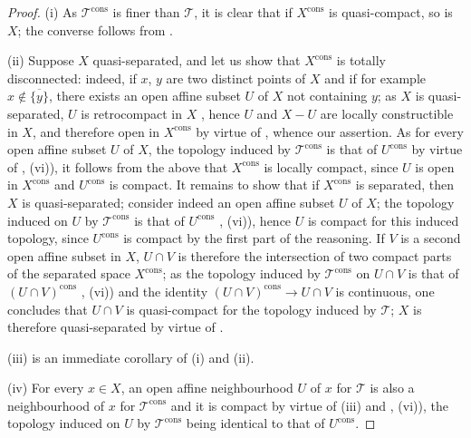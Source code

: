 \begin{proof}
(i) As $\mathscr{T}^{\mathrm{cons}}$ is finer than $\mathscr{T}$, it is clear that if $X^{\mathrm{cons}}$ is quasi-compact, so is $X$; the converse follows from .

(ii) Suppose $X$ quasi-separated, and let us show that $X^{\mathrm{cons}}$ is totally disconnected: indeed, if $x$, $y$ are two distinct points of $X$ and if for example $x\notin\overline{\{y\}}$, there exists an open affine subset $U$ of $X$ not containing $y$; as $X$ is quasi-separated, $U$ is retrocompact in $X$ , hence $U$ and $X-U$ are locally constructible in $X$, and therefore open in $X^{\mathrm{cons}}$ by virtue of , whence our assertion.
As for every open affine subset $U$ of $X$, the topology induced by $\mathscr{T}^{\mathrm{cons}}$ is that of $U^{\mathrm{cons}}$ by virtue of , (vi)), it follows from the above that $X^{\mathrm{cons}}$ is locally compact, since $U$ is open in $X^{\mathrm{cons}}$ and $U^{\mathrm{cons}}$ is compact.
It remains to show that if $X^{\mathrm{cons}}$ is separated, then $X$ is quasi-separated; consider indeed an open affine subset $U$ of $X$; the topology induced on $U$ by $\mathscr{T}^{\mathrm{cons}}$ is that of $U^{\mathrm{cons}}$ , (vi)), hence $U$ is compact for this induced topology, since $U^{\mathrm{cons}}$ is compact by the first part of the reasoning.
If $V$ is a second open affine subset in $X$, $U\cap V$ is therefore the intersection of two compact parts of the separated space $X^{\mathrm{cons}}$; as the topology induced by $\mathscr{T}^{\mathrm{cons}}$ on $U\cap V$ is that of $(U\cap V)^{\mathrm{cons}}$ , (vi)) and the identity $(U\cap V)^{\mathrm{cons}}\to U\cap V$ is continuous, one concludes that $U\cap V$ is quasi-compact for the topology induced by $\mathscr{T}$; $X$ is therefore quasi-separated by virtue of .

(iii) is an immediate corollary of (i) and (ii).

(iv) For every $x\in X$, an open affine neighbourhood $U$ of $x$ for $\mathscr{T}$ is also a neighbourhood of $x$ for $\mathscr{T}^{\mathrm{cons}}$ and it is compact by virtue of (iii) and , (vi)), the topology induced on $U$ by $\mathscr{T}^{\mathrm{cons}}$ being identical to that of $U^{\mathrm{cons}}$.


\end{proof}
